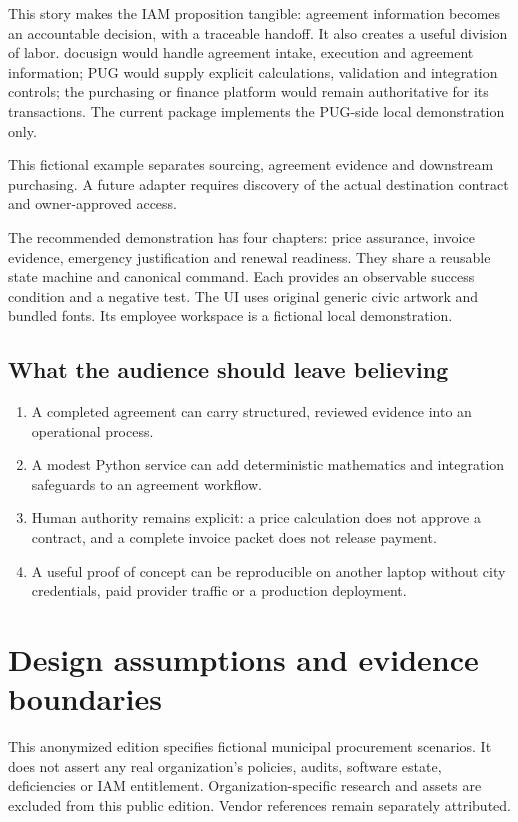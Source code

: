 \documentclass[11pt,letterpaper]{article}
\begin{document}
This story makes the IAM proposition tangible: agreement information becomes an accountable decision, with a traceable handoff. It also creates a useful division of labor. docusign would handle agreement intake, execution and agreement information; PUG would supply explicit calculations, validation and integration controls; the purchasing or finance platform would remain authoritative for its transactions. The current package implements the PUG-side local demonstration only.

This fictional example separates sourcing, agreement evidence and downstream purchasing. A future adapter requires discovery of the actual destination contract and owner-approved access.

The recommended demonstration has four chapters: price assurance, invoice evidence, emergency justification and renewal readiness. They share a reusable state machine and canonical command. Each provides an observable success condition and a negative test. The UI uses original generic civic artwork and bundled fonts. Its employee workspace is a fictional local demonstration.

\subsection{What the audience should leave believing}
\begin{enumerate}
\item A completed agreement can carry structured, reviewed evidence into an operational process.
\item A modest Python service can add deterministic mathematics and integration safeguards to an agreement workflow.
\item Human authority remains explicit: a price calculation does not approve a contract, and a complete invoice packet does not release payment.
\item A useful proof of concept can be reproducible on another laptop without city credentials, paid provider traffic or a production deployment.
\end{enumerate}

\section{Design assumptions and evidence boundaries}
This anonymized edition specifies fictional municipal procurement scenarios. It does not assert any real organization's policies, audits, software estate, deficiencies or IAM entitlement. Organization-specific research and assets are excluded from this public edition. Vendor references remain separately attributed.
\end{document}
